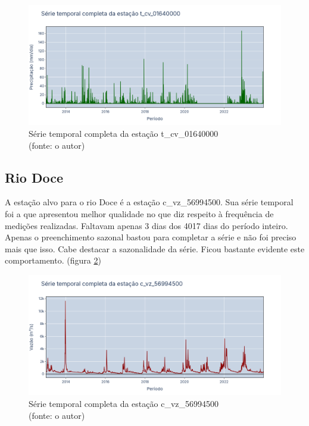 \begin{figure}[!h]
	\centering
	\includegraphics[scale=0.25]{Figuras/jequiti/jequitinhonhaSerieCompleta_t_cv_01640000.png}
	\caption{Série temporal completa da estação t\_cv\_01640000\\(fonte: o autor)}
	\label{fig:jequitinhonhaSerieCompleta_t_cv_01640000}
\end{figure}

\subsection{Rio Doce}

A estação alvo para o rio Doce é a estação c\_vz\_56994500. Sua série temporal foi a que apresentou melhor qualidade no que diz respeito à frequência de medições realizadas. Faltavam apenas 3 dias dos 4017 dias do período inteiro. Apenas o preenchimento sazonal bastou para completar a série e não foi preciso mais que isso. Cabe destacar a sazonalidade da série. Ficou bastante evidente este comportamento. (figura \ref{fig:doceSerieCompleta_c_vz_56994500})

\begin{figure}[!h]
	\centering
	\includegraphics[scale=0.25]{Figuras/rio_doce/doceSerieCompleta_c_vz_56994500.png}
	\caption{Série temporal completa da estação c\_vz\_56994500\\(fonte: o autor)}
	\label{fig:doceSerieCompleta_c_vz_56994500}
\end{figure}

